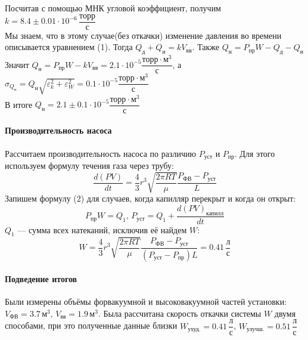 \documentclass{letnab}
\begin{document}
Посчитав с помощью МНК угловой коэффициент, получим $k = 8.4\pm0.01 \cdot 10^{-6} \,\dfrac{\text{торр}}{\text{с}}$\\
Мы знаем, что в этому случае(без откачки) изменение давления во времени описывается уравнением (1). Тогда $Q_\text{д} + Q_\text{и} = kV_\text{вв}$. Также $Q_\text{н}=P_\text{пр}W-Q_\text{д}-Q_\text{и}$\\ Значит $Q_\text{н}=P_\text{пр}W-kV_\text{вв} = 2.1 \cdot 10^{-5} \dfrac{\text{торр}\cdot\text{м}^3}{\text{с}}$, а $\sigma_{Q_\text{н}}=Q_\text{н}\sqrt{\varepsilon_k^2+\varepsilon_W^2} = 0.1\cdot 10^{-5} \dfrac{\text{торр}\cdot\text{м}^3}{\text{с}}$\\
\large
В итоге $Q_\text{н} = 2.1 \pm 0.1 \cdot 10^{-5} \dfrac{\text{торр}\cdot\text{м}^3}{\text{с}}$
\normalsize 
\paragraph{Производительность насоса} Рассчитаем производительность насоса по различию $P_\text{уст}$ и $P_\text{пр}$. Для этого используем формулу течения газа через трубу:
\begin{equation}
\dfrac{d(PV)}{dt}=\dfrac{4}{3}r^3\sqrt{\dfrac{2\pi RT}{\mu}}\dfrac{P_\text{ФВ}-P_\text{уст}}{L}
\end{equation}
Запишем формулу (2) для случаев, когда капилляр перекрыт и когда он открыт:
\begin{equation}
P_\text{пр}W = Q_1,\, P_\text{уст}=Q_1 + \dfrac{d(PV)_\text{капилл}}{dt} 
\end{equation}
$Q_1$ --- сумма всех натеканий, исключив её найдем $W$:
\begin{equation}
W = \dfrac{4}{3}r^3\sqrt{\dfrac{2\pi RT}{\mu}}\dfrac{P_\text{ФВ}-P_\text{уст}}{(P_\text{уст}-P_\text{пр})L}=0.41\,\dfrac{\text{л}}{\text{с}}
\end{equation}
\paragraph{Подведение итогов}
Были измерены объёмы форвакуумной и высоковакуумной частей установки: $V_\text{ФВ}=3.7\,\text{м}^3,\, V_\text{вв}=1.9\,\text{м}^3$. Была рассчитана скорость откачки системы $W$ двумя способами, при это полученные данные близки $W_\text{ухуд.} = 0.41\, \dfrac{\text{л}}{\text{с}}$, $W_\text{улучш.} = 0.51\, \dfrac{\text{л}}{\text{с}}$
\end{document}
